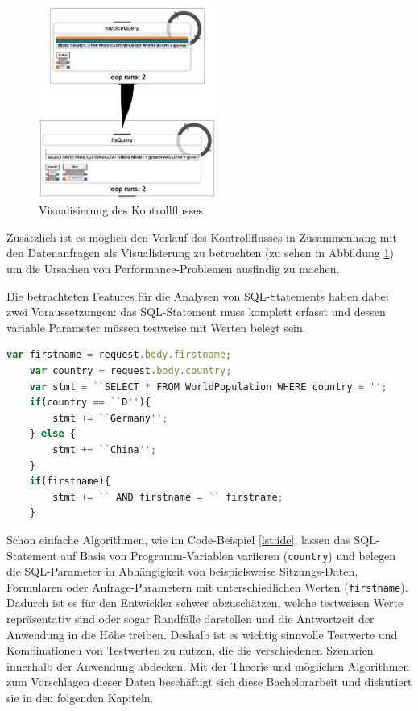 \begin{figure}[ht]
	\centering
  \includegraphics[width=0.52\textwidth]{figures/feedback.png}
	\caption{Visualisierung des Kontrollflusses}
	\label{fig:feedback}
\end{figure}

Zusätzlich ist es möglich den Verlauf des Kontrollflusses in Zusammenhang mit den Datenanfragen als Visualisierung zu betrachten \cite{Frahnow2014} (zu sehen in Abbildung \ref{fig:feedback}) um die Ursachen von Performance-Problemen ausfindig zu machen.

Die betrachteten Features für die Analysen von SQL-Statements haben dabei zwei Voraussetzungen: das SQL-Statement muss komplett erfasst und dessen variable Parameter müssen testweise mit Werten belegt sein.

\begin{lstlisting}[caption={Variablen nehmen Einfluss auf die SQL-Query und -Parameter}, label={lst:ide}, language=JavaScript]
	var firstname = request.body.firstname;
	var country = request.body.country;
	var stmt = ``SELECT * FROM WorldPopulation WHERE country = '';
	if(country == ``D''){
		stmt += ``Germany'';
	} else {
		stmt += ``China'';
	}
	if(firstname){
		stmt += `` AND firstname = `` firstname;
	}
\end{lstlisting}

Schon einfache Algorithmen, wie im Code-Beispiel \ref{lst:ide}, lassen das SQL-Statement auf Basis von Programm-Variablen variieren (\texttt{country}) und belegen die SQL-Parameter in Abhängigkeit von beispielsweise Sitzungs-Daten, Formularen oder Anfrage-Parametern mit unterschiedlichen Werten (\texttt{firstname}).
Dadurch ist es für den Entwickler schwer abzuschätzen, welche testweisen Werte repräsentativ sind oder sogar Randfälle darstellen und die Antwortzeit der Anwendung in die Höhe treiben.
Deshalb ist es wichtig sinnvolle Testwerte und Kombinationen von Testwerten zu nutzen, die die verschiedenen Szenarien innerhalb der Anwendung abdecken.
Mit der Theorie und möglichen Algorithmen zum Vorschlagen dieser Daten beschäftigt sich diese Bachelorarbeit und diskutiert sie in den folgenden Kapiteln.
